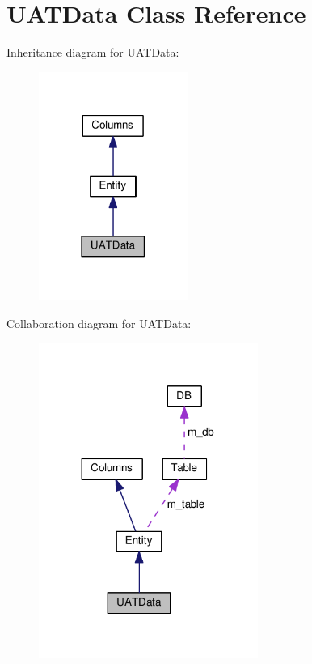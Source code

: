 \hypertarget{classUATData}{}\section{U\+A\+T\+Data Class Reference}
\label{classUATData}


Inheritance diagram for U\+A\+T\+Data\+:\nopagebreak
\begin{figure}[H]
\begin{center}
\leavevmode
\includegraphics[width=138pt]{classUATData__inherit__graph}
\end{center}
\end{figure}


Collaboration diagram for U\+A\+T\+Data\+:\nopagebreak
\begin{figure}[H]
\begin{center}
\leavevmode
\includegraphics[width=203pt]{classUATData__coll__graph}
\end{center}
\end{figure}
